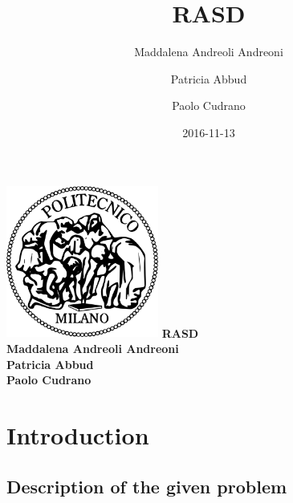 \documentclass{article}
\title{RASD}
\date{2016-11-13}
\author{
	Maddalena Andreoli Andreoni
	\and
	Patricia Abbud
	\and
	Paolo Cudrano
}
\begin{document}
	\begin{titlepage}
	    \centering
	    \includegraphics[width=5cm]{img/polimi_logo.png} %
	    \vfill
	    {\bfseries\Large
	        RASD\\
	        \vskip4cm
	        Maddalena Andreoli Andreoni\\
					Patricia Abbud\\
	        Paolo Cudrano\\
	    }    
	    \vfill
	    \vfill
	\end{titlepage}

	\tableofcontents
	\newpage	
  
  \section{Introduction}
		\subsection{Description of the given problem}
		
		
	\newpage
	\begin{appendix}
	  \listoffigures
	  \listoftables
	\end{appendix}
\end{document}
